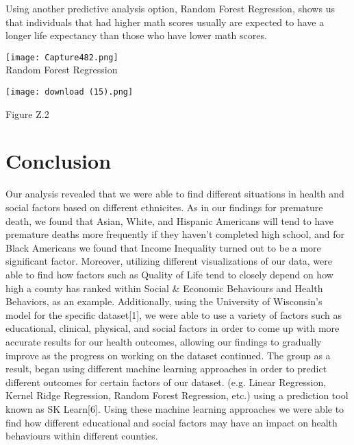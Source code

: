 \documentclass[conference]{IEEEtran}
\begin{document}
Using another predictive analysis option,
Random Forest Regression, 
shows us that individuals that had higher math scores usually are expected
to have a longer life expectancy than those
who have lower math scores.

\begin{center}
 \texttt{[image: Capture482.png]}\\
 \footnotesize{Random Forest Regression}
\end{center}

 \texttt{[image: download (15).png]}
\begin{center}
\footnotesize{Figure Z.2}
\end{center}

\section{Conclusion}
Our analysis revealed that we were able to find different situations
in health and social factors based on different ethnicites. As in our 
findings for premature death, we found that Asian, White, and Hispanic
Americans will tend to have premature deaths more frequently if they haven't
completed high school, and for Black Americans we found that Income Inequality
turned out to be a more significant factor. Moreover, utilizing different 
visualizations of our data, were able to find how factors such as 
Quality of Life tend to closely depend on how high a county has ranked within 
Social \& Economic Behaviours and Health Behaviors, as an example.
Additionally, using the University of Wisconsin's model for the specific dataset[1],
we were able to use a variety of factors such as educational, clinical, physical,
and social factors in order to come up with more accurate results for our
health outcomes, allowing our findings to gradually improve as the progress on working on the dataset continued. The group as a result, began using 
different machine learning approaches in order to predict different
outcomes for certain factors of our dataset. (e.g. Linear Regression, Kernel Ridge Regression, Random Forest Regression, etc.) using a prediction tool known as SK Learn[6]. Using these machine learning approaches we were able to find how different educational and social factors may have an impact on health behaviours within
different counties.
\end{document}
